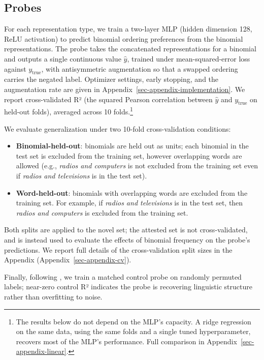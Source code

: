 \documentclass[11pt]{article}
\providecommand{\tightlist}{%
  \setlength{\itemsep}{0pt}\setlength{\parskip}{0pt}}
\begin{document}
\subsection{Probes}\label{probes}

For each representation type, we train a two-layer MLP (hidden dimension
128, ReLU activation) to predict binomial ordering preferences from the
binomial representations. The probe takes the concatenated
representations for a binomial and outputs a single continuous value
\(\hat{y}\), trained under mean-squared-error loss against
\(y_{\text{true}}\), with antisymmetric augmentation so that a swapped
ordering carries the negated label. Optimizer settings, early stopping,
and the augmentation rate are given in
Appendix~\ref{sec-appendix-implementation}. We report cross-validated R²
(the squared Pearson correlation between \(\hat{y}\) and
\(y_{\text{true}}\) on held-out folds), averaged across 10
folds.\footnote{The results below do not depend on the MLP's capacity. A
  ridge regression on the same data, using the same folds and a single
  tuned hyperparameter, recovers most of the MLP's performance. Full
  comparison in Appendix~\ref{sec-appendix-linear}.}

We evaluate generalization under two 10-fold cross-validation
conditions:

\begin{itemize}
\tightlist
\item
  \textbf{Binomial-held-out}: binomials are held out as units; each
  binomial in the test set is excluded from the training set, however
  overlapping words are allowed (e.g., \emph{radios and computers} is
  not excluded from the training set even if \emph{radios and
  televisions} is in the test set).
\item
  \textbf{Word-held-out}: binomials with overlapping words are excluded
  from the training set. For example, if \emph{radios and televisions}
  is in the test set, then \emph{radios and computers} is excluded from
  the training set.
\end{itemize}

Both splits are applied to the novel set; the attested set is not
cross-validated, and is instead used to evaluate the effects of binomial
frequency on the probe's predictions. We report full details of the
cross-validation split sizes in the Appendix
(Appendix~\ref{sec-appendix-cv}).

Finally, following \citet{hewitt-liang-2019-designing}, we train a
matched control probe on randomly permuted labels; near-zero control R²
indicates the probe is recovering linguistic structure rather than
overfitting to noise.
\end{document}
